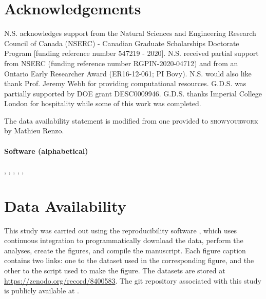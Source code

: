 \documentclass[fleqn,usenatbib]{mnras}
\begin{document}




\section*{Acknowledgements} \label{sec:acknowledgements}

    N.S. acknowledges support from the Natural Sciences and Engineering Research
    Council of Canada (NSERC) - Canadian Graduate Scholarships Doctorate Program
    [funding reference number 547219 - 2020].  N.S. received partial support
    from NSERC (funding reference number RGPIN-2020-04712) and from an Ontario
    Early Researcher Award (ER16-12-061; PI Bovy).  N.S. would also like thank
    Prof. Jeremy Webb for providing computational resources.
    G.D.S. was partially supported by DOE grant DESC0009946.  G.D.S. thanks
    Imperial College London for hospitality while some of this work was
    completed.

    The data availability statement is modified from one provided to
    \textsc{showyourwork} by Mathieu Renzo.

    \vspace{20pt}
    \paragraph*{Software (alphabetical)}

         \citep{Greenfield+2015}, %
         \citep{Astropy+2013, Astropy+2018, Astropy+2022}, %
         \citep{CLASS1, CLASS2} %
         \citep{cosmology-api} %
         \citep{interpolated-coordinates} %
         \citep{Hunter2007}, %
         \citep{Harris+2020}, %
         \citep{Scipy2020}, %
         \citep{Luger+2021} %





\section*{Data Availability} \label{sec:data_availability}

    This study was carried out using the reproducibility software
    \href{https://github.com/showyourwork/showyourwork}{\showyourwork}
    \citep{Luger+2021}, which uses continuous integration to programmatically
    download the data, perform the analyses, create the figures, and compile the
    manuscript.  Each figure caption contains two links: one to the dataset used
    in the corresponding figure, and the other to the script used to make the
    figure.  The datasets are stored at \url{https://zenodo.org/record/8400583}.
    The git repository associated with this study is publicly available at
    \href{https://github.com/nstarman/Temperature-Diffusion-Spectral-Distortion-Paper/}{}.
\end{document}
